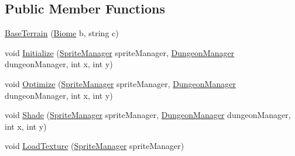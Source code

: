 \subsection*{Public Member Functions}
\begin{DoxyCompactItemize}
\item 
\mbox{\hyperlink{class_base_terrain_a148b6e7aa268ebec1ab02c5e9f01f92d}{Base\+Terrain}} (\mbox{\hyperlink{class_biome}{Biome}} b, string c)
\item 
void \mbox{\hyperlink{class_base_terrain_aff9e343986e2b76d0fc22be3a5e246dc}{Initialize}} (\mbox{\hyperlink{class_sprite_manager}{Sprite\+Manager}} sprite\+Manager, \mbox{\hyperlink{class_dungeon_manager}{Dungeon\+Manager}} dungeon\+Manager, int x, int y)
\item 
void \mbox{\hyperlink{class_base_terrain_abda1c3ac02dc72095eb8c50ef68f8a2e}{Optimize}} (\mbox{\hyperlink{class_sprite_manager}{Sprite\+Manager}} sprite\+Manager, \mbox{\hyperlink{class_dungeon_manager}{Dungeon\+Manager}} dungeon\+Manager, int x, int y)
\item 
void \mbox{\hyperlink{class_base_terrain_ac52fb05dde7ffc3a3d88af0122516052}{Shade}} (\mbox{\hyperlink{class_sprite_manager}{Sprite\+Manager}} sprite\+Manager, \mbox{\hyperlink{class_dungeon_manager}{Dungeon\+Manager}} dungeon\+Manager, int x, int y)
\item 
void \mbox{\hyperlink{class_base_terrain_ada3cddbd511be2890cbb9635d997441b}{Load\+Texture}} (\mbox{\hyperlink{class_sprite_manager}{Sprite\+Manager}} sprite\+Manager)
\end{DoxyCompactItemize}
